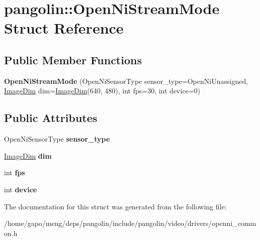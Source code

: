 \hypertarget{structpangolin_1_1_open_ni_stream_mode}{}\section{pangolin\+:\+:Open\+Ni\+Stream\+Mode Struct Reference}
\label{structpangolin_1_1_open_ni_stream_mode}
\subsection*{Public Member Functions}
\begin{DoxyCompactItemize}
\item 
{\bfseries Open\+Ni\+Stream\+Mode} (Open\+Ni\+Sensor\+Type sensor\+\_\+type=Open\+Ni\+Unassigned, \hyperlink{structpangolin_1_1_image_dim}{Image\+Dim} dim=\hyperlink{structpangolin_1_1_image_dim}{Image\+Dim}(640, 480), int fps=30, int device=0)\hypertarget{structpangolin_1_1_open_ni_stream_mode_aab06a94d699b37715694c94cf18dceae}{}\label{structpangolin_1_1_open_ni_stream_mode_aab06a94d699b37715694c94cf18dceae}

\end{DoxyCompactItemize}
\subsection*{Public Attributes}
\begin{DoxyCompactItemize}
\item 
Open\+Ni\+Sensor\+Type {\bfseries sensor\+\_\+type}\hypertarget{structpangolin_1_1_open_ni_stream_mode_a87b017173d08f90e80f459da305e8096}{}\label{structpangolin_1_1_open_ni_stream_mode_a87b017173d08f90e80f459da305e8096}

\item 
\hyperlink{structpangolin_1_1_image_dim}{Image\+Dim} {\bfseries dim}\hypertarget{structpangolin_1_1_open_ni_stream_mode_ab7e56b24c64b30e31dc3be2c0bdb0b07}{}\label{structpangolin_1_1_open_ni_stream_mode_ab7e56b24c64b30e31dc3be2c0bdb0b07}

\item 
int {\bfseries fps}\hypertarget{structpangolin_1_1_open_ni_stream_mode_a4c86dcc176a53ff1be30fb4853727208}{}\label{structpangolin_1_1_open_ni_stream_mode_a4c86dcc176a53ff1be30fb4853727208}

\item 
int {\bfseries device}\hypertarget{structpangolin_1_1_open_ni_stream_mode_a6c9a01dba2b18a7b821f7461b73ed23c}{}\label{structpangolin_1_1_open_ni_stream_mode_a6c9a01dba2b18a7b821f7461b73ed23c}

\end{DoxyCompactItemize}


The documentation for this struct was generated from the following file\+:\begin{DoxyCompactItemize}
\item 
/home/gapo/meng/deps/pangolin/include/pangolin/video/drivers/openni\+\_\+common.\+h\end{DoxyCompactItemize}
